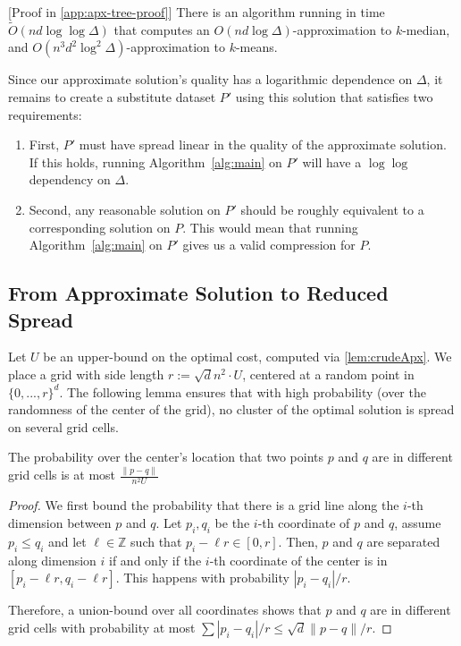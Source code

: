 \begin{lemma}\label{lem:crudeApx}[Proof in \cref{app:apx-tree-proof}]
There is an algorithm running in time $\tilde O(nd \log \log \Delta)$ that computes an $O(n d \log \Delta)$-approximation to $k$-median, and $O(n^3 d^2 \log^2
\Delta)$-approximation to $k$-means.

\end{lemma}

Since our approximate solution's quality has a logarithmic dependence on $\Delta$, it remains to create a substitute dataset $P'$ using this solution that
satisfies two requirements:
\begin{enumerate}
    \item First, $P'$ must have spread linear in the quality of the approximate solution. If this holds, running Algorithm~\ref{alg:main} on $P'$ will have
        a $\log \log$ dependency on $\Delta$.
    \item Second, any reasonable solution on $P'$ should be roughly equivalent to a corresponding solution on $P$. This would mean that running
        Algorithm~\ref{alg:main} on $P'$ gives us a valid compression for $P$.
\end{enumerate}

\subsection{From Approximate Solution to Reduced Spread}
\label{ssec:reduce_spread}

Let $U$ be an upper-bound on the optimal cost, computed via \cref{lem:crudeApx}. We place a grid with side length $r:= \sqrt{d} n^2\cdot U$, centered at
a random point in $\{0, ..., r\}^d$.  The following lemma ensures that with high probability (over the randomness of the center of the grid), no cluster of the
optimal solution is spread on several grid cells.

\begin{lemma}\label{lem:quadtreeSep}

The probability over the center's location that two points $p$ and $q$ are in different grid cells is at most $\frac{\|p-q\|}{n^2 U}$

\end{lemma}
\begin{proof}
We first bound the probability that there is a grid line along the $i$-th dimension between $p$ and $q$. Let $p_i, q_i$ be the $i$-th coordinate of $p$ and $q$,
assume $p_i \leq q_i$ and let $\ell \in \mathbb{Z}$ such that $p_i - \ell r \in [0, r]$.  Then, $p$ and $q$ are separated along dimension $i$ if and only if the
$i$-th coordinate of the center is in $[p_i - \ell r, q_i - \ell r]$. This happens with probability $|p_i - q_i|/r$. 

Therefore, a union-bound over all coordinates shows that $p$ and $q$ are in different grid cells with probability at most $\sum |p_i-q_i| / r \leq \sqrt{d} \|p-q\|/r$.
\end{proof}


